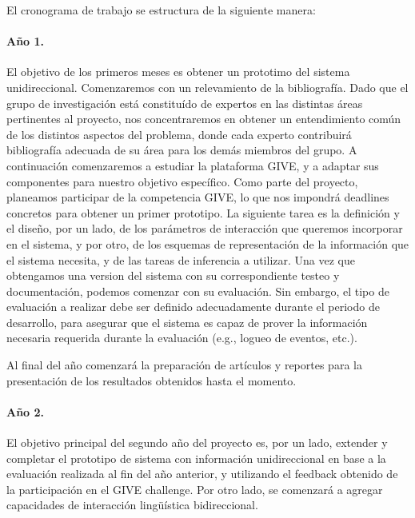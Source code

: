 
El cronograma de trabajo se estructura de la siguiente manera:

\paragraph{A\~no 1.} El objetivo de los primeros meses es obtener un
prototimo del sistema unidireccional.  Comenzaremos con un relevamiento
de la bibliograf\'ia.  Dado que el grupo de investigaci\'on est\'a
constitu\'ido de expertos en las distintas \'areas pertinentes al
proyecto, nos concentraremos en obtener un
entendimiento com\'un de los distintos aspectos del problema, donde
cada experto contribuir\'a bibliograf\'ia adecuada de su \'area para los
dem\'as miembros del grupo.  A continuaci\'on comenzaremos a estudiar
la plataforma GIVE, y a adaptar sus componentes para nuestro objetivo
espec\'ifico.  Como parte del proyecto, planeamos participar de la 
competencia GIVE, lo que nos impondr\'a deadlines concretos para obtener un
primer prototipo.  La siguiente tarea es la definici\'on  y el dise\~no,
por un lado, de los par\'ametros de interacci\'on que queremos incorporar
en el sistema, y por otro, de los esquemas de representaci\'on de la
informaci\'on que el sistema necesita, y de las tareas de inferencia a
utilizar.
Una vez que obtengamos una version del sistema con su
correspondiente testeo y documentaci\'on, podemos comenzar con
su evaluaci\'on.  Sin embargo,
el tipo de evaluaci\'on a realizar debe ser definido
adecuadamente durante el periodo de desarrollo, para asegurar que el sistema
es capaz de prover la informaci\'on necesaria requerida durante la evaluaci\'on
(e.g., logueo de eventos, etc.).

Al final del a\~no comenzar\'a la preparaci\'on de art\'iculos y reportes para
la presentaci\'on de los resultados obtenidos hasta el momento.

\paragraph{A\~no 2.} El objetivo principal del segundo a\~no del proyecto es,
por un lado, extender y completar el prototipo de sistema con informaci\'on
unidireccional en base a la evaluaci\'on realizada al fin del a\~no anterior,
y utilizando el feedback obtenido de la
participaci\'on en el GIVE challenge.  Por otro lado, se comenzar\'a a agregar
capacidades de interacci\'on ling\"u\'istica bidireccional.

